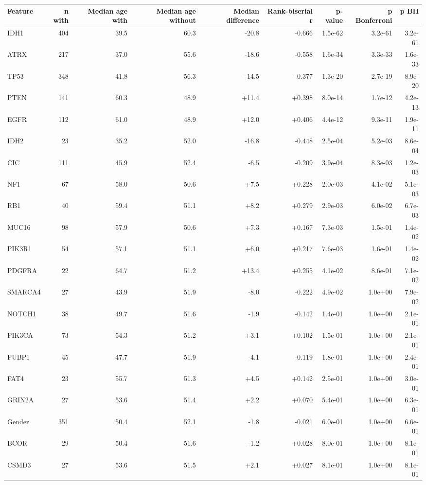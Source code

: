 \begin{tabular}{lrrrrrrrr}
\toprule
\textbf{Feature} & \textbf{n with} & \textbf{Median age with} & \textbf{Median age without} & \textbf{Median difference} & \textbf{Rank-biserial r} & \textbf{p-value} & \textbf{p Bonferroni} & \textbf{p BH} \\
\midrule
IDH1 & 404 & 39.5 & 60.3 & -20.8 & -0.666 & 1.5e-62 & 3.2e-61 & 3.2e-61 \\
ATRX & 217 & 37.0 & 55.6 & -18.6 & -0.558 & 1.6e-34 & 3.3e-33 & 1.6e-33 \\
TP53 & 348 & 41.8 & 56.3 & -14.5 & -0.377 & 1.3e-20 & 2.7e-19 & 8.9e-20 \\
PTEN & 141 & 60.3 & 48.9 & +11.4 & +0.398 & 8.0e-14 & 1.7e-12 & 4.2e-13 \\
EGFR & 112 & 61.0 & 48.9 & +12.0 & +0.406 & 4.4e-12 & 9.3e-11 & 1.9e-11 \\
IDH2 & 23 & 35.2 & 52.0 & -16.8 & -0.448 & 2.5e-04 & 5.2e-03 & 8.6e-04 \\
CIC & 111 & 45.9 & 52.4 & -6.5 & -0.209 & 3.9e-04 & 8.3e-03 & 1.2e-03 \\
NF1 & 67 & 58.0 & 50.6 & +7.5 & +0.228 & 2.0e-03 & 4.1e-02 & 5.1e-03 \\
RB1 & 40 & 59.4 & 51.1 & +8.2 & +0.279 & 2.9e-03 & 6.0e-02 & 6.7e-03 \\
MUC16 & 98 & 57.9 & 50.6 & +7.3 & +0.167 & 7.3e-03 & 1.5e-01 & 1.4e-02 \\
PIK3R1 & 54 & 57.1 & 51.1 & +6.0 & +0.217 & 7.6e-03 & 1.6e-01 & 1.4e-02 \\
PDGFRA & 22 & 64.7 & 51.2 & +13.4 & +0.255 & 4.1e-02 & 8.6e-01 & 7.1e-02 \\
SMARCA4 & 27 & 43.9 & 51.9 & -8.0 & -0.222 & 4.9e-02 & 1.0e+00 & 7.9e-02 \\
NOTCH1 & 38 & 49.7 & 51.6 & -1.9 & -0.142 & 1.4e-01 & 1.0e+00 & 2.1e-01 \\
PIK3CA & 73 & 54.3 & 51.2 & +3.1 & +0.102 & 1.5e-01 & 1.0e+00 & 2.1e-01 \\
FUBP1 & 45 & 47.7 & 51.9 & -4.1 & -0.119 & 1.8e-01 & 1.0e+00 & 2.4e-01 \\
FAT4 & 23 & 55.7 & 51.3 & +4.5 & +0.142 & 2.5e-01 & 1.0e+00 & 3.0e-01 \\
GRIN2A & 27 & 53.6 & 51.4 & +2.2 & +0.070 & 5.4e-01 & 1.0e+00 & 6.3e-01 \\
Gender & 351 & 50.4 & 52.1 & -1.8 & -0.021 & 6.0e-01 & 1.0e+00 & 6.6e-01 \\
BCOR & 29 & 50.4 & 51.6 & -1.2 & +0.028 & 8.0e-01 & 1.0e+00 & 8.1e-01 \\
CSMD3 & 27 & 53.6 & 51.5 & +2.1 & +0.027 & 8.1e-01 & 1.0e+00 & 8.1e-01 \\
\bottomrule
\end{tabular}
